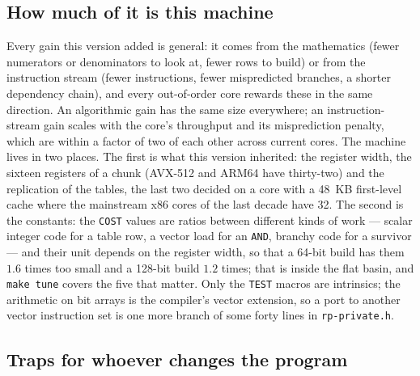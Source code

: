 \documentclass[12pt,a4paper,oneside]{amsart}
\begin{document}
\subsection{How much of it is this machine}\label{app:machine}

Every gain this version added is general: it comes from the mathematics
(fewer numerators or denominators to look at, fewer rows to build) or from
the instruction stream (fewer instructions, fewer mispredicted branches, a
shorter dependency chain), and every out-of-order core rewards these in the
same direction. An algorithmic gain has the same size everywhere; an
instruction-stream gain scales with the core's throughput and its
misprediction penalty, which are within a factor of two of each other
across current cores. The machine lives in two places. The first is what
this version inherited: the register width, the sixteen registers of a
chunk (AVX-512 and ARM64 have thirty-two) and the replication of the tables,
the last two decided on a core with a 48~KB first-level cache where the
mainstream x86 cores of the last decade have 32. The second is the
constants: the \texttt{COST} values are ratios between different kinds of
work --- scalar integer code for a table row, a vector load for an
\texttt{AND}, branchy code for a survivor --- and their unit depends on the
register width, so that a 64-bit build has them $1.6$ times too small and a
128-bit build $1.2$ times; that is inside the flat basin, and \texttt{make
tune} covers the five that matter. Only the \texttt{TEST} macros are
intrinsics; the arithmetic on bit arrays is the compiler's vector
extension, so a port to another vector instruction set is one more branch
of some forty lines in \texttt{rp-private.h}.

\subsection{Traps for whoever changes the program}\label{app:traps}
\end{document}

